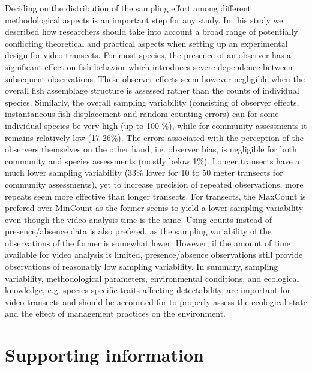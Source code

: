 \documentclass[10pt,letterpaper]{article}
\begin{document}
Deciding on the distribution of the sampling effort among different methodological aspects is an important step for any study. In this study we described how researchers should take into account a broad range of potentially conflicting theoretical and practical aspects when setting up an experimental design for video transects. For most species, the presence of an observer has a significant effect on fish behavior which introduces severe dependence between subsequent observations. These observer effects seem however negligible when the overall fish assemblage structure is assessed rather than the counts of individual species. Similarly, the overall sampling variability (consisting of observer effects, instantaneous fish displacement and random counting errors) can for some individual species be very high (up to 100 \%), while for community assessments it remains relatively low (17-26\%). The errors associated with the perception of the observers themselves on the other hand, i.e. observer bias, is negligible for both community and species assessments (mostly below 1\%). Longer transects have a much lower sampling variability (33\% lower for 10 to 50 meter transects for community assessments), yet to increase precision of repeated observations, more repeats seem more effective than longer transects. For transects, the MaxCount is prefered over MinCount as the former seems to yield a lower sampling variability even though the video analysis time is the same. Using counts instead of presence/absence data is also prefered, as the sampling variability of the observations of the former is somewhat lower. However, if the amount of time available for video analysis is limited, presence/absence observations still provide observations of reasonably low sampling variability. In summary, sampling variability, methodological parameters, environmental conditions, and ecological knowledge, e.g. species-specific traits affecting detectability, are important for video transects and should be accounted for to properly assess the ecological state and the effect of management practices on the environment. 

\section*{Supporting information}

\end{document}
